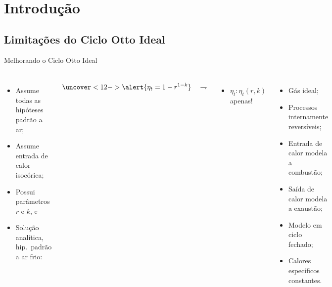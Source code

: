\section{Introdução}

\subsection{Limitações do Ciclo Otto Ideal}

    \begin{frame}{Melhorando o Ciclo Otto Ideal}\vspace*{-2em}
        \begin{columns}
        \begin{itemize}
            \item<2->  Assume todas as \alert{hipóteses padrão a ar};
            \item<8->  Assume entrada de calor \alert{isocórica};
            \item<9->  Possui parâmetros \alert{$r$} e \alert{$k$}, e
            \item<10-> Solução analítica, \alert{hip.~padrão a ar frio}:\\[\bigskipamount]
        \end{itemize}
        \begin{equation*}
            \uncover<12->{\alert{\eta_t = 1 - r^{1-k}}\quad\rightharpoondown}
        \end{equation*}%
        \vspace*{-1em}
        \begin{itemize}
            \item<13-> $\eta_t\!:\!\eta_t(r, k)$ \alert{apenas}!
        \end{itemize}
        \begin{itemize}
            \item<3->  Gás \alert{ideal};
            \item<4->  Processos \alert{internamente reversíveis};
            \item<5->  Entrada de \alert{calor} modela a combustão;
            \item<6->  Saída de \alert{calor} modela a exaustão;
            \item<7->  Modelo em \alert{ciclo fechado};
            \item<11-> Calores específicos \alert{constantes}.
        \end{itemize}
        \end{columns}
    \end{frame}

